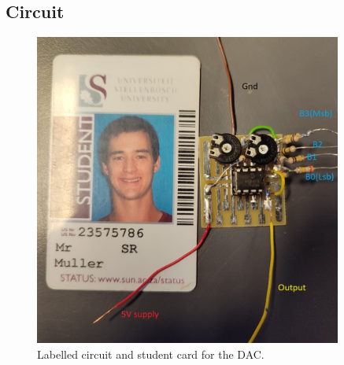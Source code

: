 \subsection{Circuit}
\begin{figure}[H]
\centering
\includegraphics[width = 0.9\textwidth]{./Figures/DAC_Cir_Card.jpeg}
\caption{Labelled circuit and student card for the DAC.}
\label{fig:sonicsen_cir_card}
\end{figure}